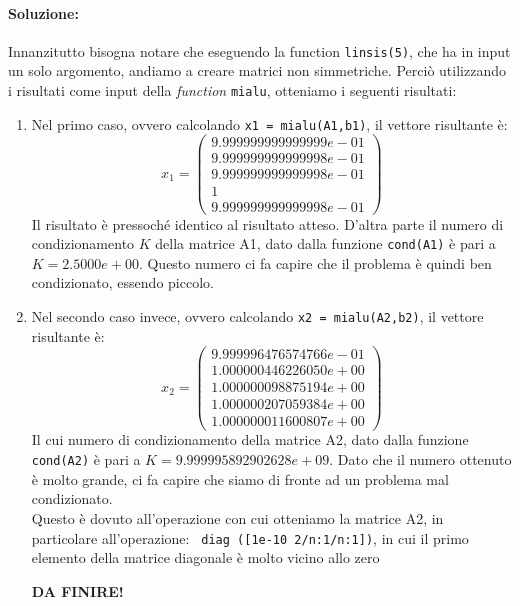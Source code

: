 \documentclass[12pt]{article}
\begin{document}
\paragraph{Soluzione:}
Innanzitutto bisogna notare che eseguendo la function \texttt{linsis(5)}, che ha in input un solo argomento, andiamo a creare matrici non simmetriche. 
Perciò utilizzando i risultati come input della \textit{function} \texttt{mialu}, otteniamo i seguenti risultati:
\begin{enumerate}
    \item Nel primo caso, ovvero calcolando \texttt{x1 = mialu(A1,b1)}, il vettore risultante è: 
    \begin{equation*} x_1=
        \begin{pmatrix}
            9.999999999999999e-01\\
            9.999999999999998e-01\\
            9.999999999999998e-01\\
            1\\
            9.999999999999998e-01
        \end{pmatrix}
    \end{equation*}
    Il risultato è pressoché identico al risultato atteso. D'altra parte il numero di condizionamento \(K\) della matrice A1, dato dalla funzione \texttt{cond(A1)}
    è pari a \(K = 2.5000e+00\). Questo numero ci fa capire che il problema è quindi ben condizionato, essendo piccolo.
    \item Nel secondo caso invece, ovvero calcolando \texttt{x2 = mialu(A2,b2)}, il vettore risultante è:
    \begin{equation*} x_2=
        \begin{pmatrix}
            9.999996476574766e-01\\
            1.000000446226050e+00\\
            1.000000098875194e+00\\
            1.000000207059384e+00\\
            1.000000011600807e+00
        \end{pmatrix}
    \end{equation*}
    Il cui numero di condizionamento della matrice A2, dato dalla funzione \texttt{cond(A2)} è pari a \(K = 9.999995892902628e+09\). Dato che il numero ottenuto è molto 
    grande, ci fa capire che siamo di fronte ad un problema mal condizionato. \\
    Questo è dovuto all'operazione con cui otteniamo la matrice A2, in particolare all'operazione: \texttt{ diag ([1e-10 2/n:1/n:1])}, in cui il primo elemento della matrice 
    diagonale è molto vicino allo zero

    \textbf{DA FINIRE!}
\end{enumerate}
\end{document}
